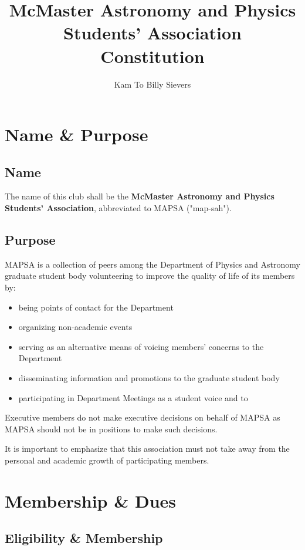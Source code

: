 \documentclass[twocolumn,reprint,nofootinbib,longbibliography,prd,superscriptaddress]{revtex4-2}
\begin{document}
		
\title{McMaster Astronomy and Physics Students' Association\\\huge{Constitution}}


\author{Kam To Billy Sievers}
\maketitle
\section{Name \& Purpose}
\subsection{Name}The name of this club shall be the \textbf{McMaster Astronomy and Physics Students' Association}, abbreviated to MAPSA ("map-sah").
\subsection{Purpose}
MAPSA is a collection of peers among the Department of Physics and Astronomy graduate student body volunteering to improve the quality of life of its members by: 
\begin{itemize}
	\item being points of contact for the Department
	\item organizing non-academic events 
	\item serving as an alternative means of voicing members' concerns to the Department
	\item disseminating information and promotions to the graduate student body
	\item participating in Department Meetings as a student voice and to 
\end{itemize}
Executive members do not make executive decisions on behalf of MAPSA as MAPSA should not be in positions to make such decisions. 

It is important to emphasize that this association must not take away from the personal and academic growth of participating members.

\section{Membership \& Dues}
\subsection{Eligibility \& Membership}
\end{document}
